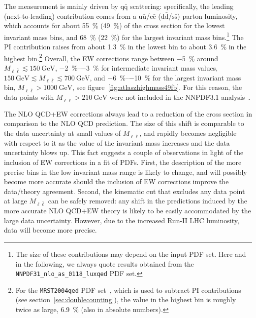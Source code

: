 The measurement is mainly driven by $\mathrm{q}\bar{\mathrm{q}}$ scattering: specifically, the
leading (next-to-leading) contribution comes from a $\mathrm{u}\bar{\mathrm{u}}$/$\mathrm{c}\bar{\mathrm{c}}$ ($\mathrm{d}\bar{\mathrm{d}}$/$\mathrm{s}\bar{\mathrm{s}}$)
parton luminosity, which accounts for about \SI{55}{\percent} (\SI{49}{\percent}) of the cross section
for the lowest invariant mass bins, and \SI{68}{\percent} (\SI{22}{\percent}) for the largest invariant
mass bins.\footnote{The size of these contributions may depend on the input PDF
  set. Here and in the following, we always quote results obtained from the
  \texttt{NNPDF31\_nlo\_as\_0118\_luxqed} PDF set.}
The PI contribution raises from about \SI{1.3}{\percent} in the lowest bin to
about \SI{3.6}{\percent} in the highest bin.\footnote{For the \texttt{MRST2004qed} PDF set~\cite{Martin:2004dh}, which is used to subtract PI contributions (see section~\ref{sec:doublecounting}), the value in the highest bin is roughly twice as large, \SI{6.9}{\percent} (also in absolute numbers).}
Overall, the EW corrections range between \SI{-5}{\percent}
around $M_{\ell\bar\ell}\lesssim \SI{150}{\giga\electronvolt}$, \SIrange{-2}{-3}{\percent} for intermediate invariant mass
values, $\SI{150}{\giga\electronvolt}\lesssim M_{\ell\bar\ell}\lesssim \SI{700}{\giga\electronvolt}$, and
\SIrange{-6}{-10}{\percent} for the largest invariant mass bin, $M_{\ell\bar\ell}>\SI{1000}{\giga\electronvolt}$,
see figure~\ref{fig:atlaszhighmass49fb}. For this reason, the data points with
$M_{\ell\bar\ell}>\SI{210}{\giga\electronvolt}$ were not included in the NNPDF3.1
analysis~\cite{Ball:2017nwa}.

The NLO QCD+EW corrections always lead to a reduction of the cross section in
comparison to the NLO QCD prediction. The size of this shift is comparable to
the data uncertainty at small values of $M_{\ell\bar\ell}$, and rapidly becomes
negligible with respect to it as the value of the invariant mass increases
and the data uncertainty blows up. This fact suggests a couple of observations
in light of the inclusion of EW corrections in a fit of PDFs. First, the
description of the more precise bins in the low invariant mass range is likely
to change, and will possibly become more accurate should the inclusion of EW
corrections improve the data/theory agreement. Second, the kinematic cut that
excludes any data point at large $M_{\ell\bar\ell}$ can be safely removed: any
shift in the predictions induced by the more accurate NLO QCD+EW theory is
likely to be easily accommodated by the large data uncertainty. However, 
due to the increased Run-II LHC luminosity, data will become more precise.


